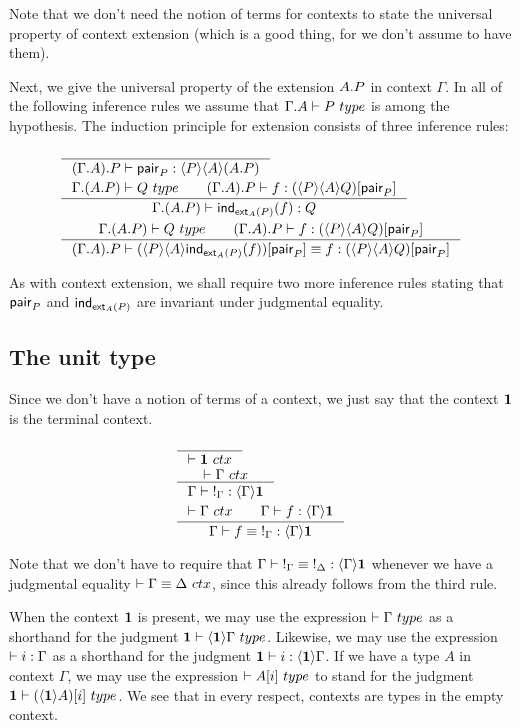 Note that we don't need the notion of terms for contexts to state the universal
property of context extension (which is a good thing, for we don't assume to have them).

Next, we give the universal property of the extension $\ctxext{A}{P}$ in context
$\Gamma$.
In all of the following inference rules we assume that $\jtype{\ctxext{\Gamma}{A}}{P}$
is among the hypothesis. The induction principle for extension consists of three
inference rules:

\begin{align}
& \inference{}
{\jterm{\ctxext{{\Gamma}{A}}{P}}{\ctxwk{P}{{A}{\ctxext{A}{P}}}}{\pair_P}}\\
& \inference{
  \jtype{\ctxext{\Gamma}{{A}{P}}}{Q}
  \qquad
  \jterm{\ctxext{{\Gamma}{A}}{P}}{\subst{\pair_P}{\ctxwk{P}{{A}{Q}}}}{f}}
  {\jterm{\ctxext{\Gamma}{{A}{P}}}{Q}{\ind{\tfext_A(P)}(f)}}\\
& \inference{
  \jtype{\ctxext{\Gamma}{{A}{P}}}{Q}
  \qquad
  \jterm{\ctxext{{\Gamma}{A}}{P}}{\subst{\pair_P}{\ctxwk{P}{{A}{Q}}}}{f}}
  {\jtermeq{\ctxext{{\Gamma}{A}}{P}}{\subst{\pair_P}{\ctxwk{P}{{A}{Q}}}}{\subst{\pair_P}{\ctxwk{P}{{A}{\ind{\tfext_A(P)}(f)}}}}{f}}
\end{align}

As with context extension, we shall require two more inference rules stating that
$\mathsf{pair}_P$ and $\mathsf{ind}_{\mathsf{ext}_A(P)}$ are invariant under judgmental equality.

\subsection{The unit type}
Since we don't have a notion of terms of a context, we just say that the context
$\mathbf{1}$ is the terminal context.

\begin{align}
& \inference{}{\jctx{\unit}}\\
& \inference{\jctx{\Gamma}}{\jhom{\Gamma}{\unit}{\tounit{\Gamma}}}\\
& \inference{\jctx{\Gamma}\qquad\jhom{\Gamma}{\unit}{f}}{\jhomeq{\Gamma}{\unit}{f}{\tounit{\Gamma}}}
\end{align}

Note that we don't have to require that $\jhomeq{\Gamma}{\unit}{\tounit{\Gamma}}{\tounit{\Delta}}$
whenever we have a judgmental equality $\jctxeq{\Gamma}{\Delta}$, since this already follows from the third rule.

When the context $\mathbf{1}$ is present, we may use the expression $\jtype{}{\Gamma}$
as a shorthand for the judgment $\jtype{\unit}{\ctxwk{\unit}{\Gamma}}$. Likewise,
we may use the expression $\jtermc{\Gamma}{i}$ as a shorthand
for the judgment $\jhom{\unit}{\Gamma}{i}$. If we have a type $A$ in context
$\Gamma$, we may use the expression $\jtype{}{\subst{i}{A}}$ to stand for
the judgment $\jtype{\unit}{\subst{i}{\ctxwk{\unit}{A}}}$. We see that in every
respect, contexts are types in the empty context.

